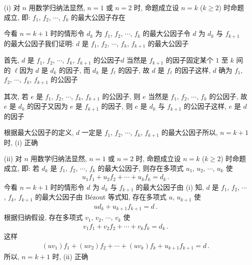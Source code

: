 \begin{pf}
    (i) 对 $n$ 用数学归纳法\period 显然, $n = 1$ 或 $n = 2$ 时, 命题成立\period 设 $n = k$ ($k \geq 2$) 时命题成立, 即: $f_1$, $f_2$, $\cdots$, $f_k$ 的最大公因子存在\period

    今看 $n = k+1$ 时的情形\period 令 $d_k$ 为 $f_1$, $f_2$, $\cdots$, $f_k$ 的最大公因子\period 令 $d$ 为 $d_k$ 与 $f_{k+1}$ 的最大公因子\period 我们证明: $d$ 是 $f_1$, $f_2$, $\cdots$, $f_k$, $f_{k+1}$ 的最大公因子\period

    首先, $d$ 是 $f_1$, $f_2$, $\cdots$, $f_k$, $f_{k+1}$ 的公因子\period $d$ 当然是 $f_{k+1}$ 的因子\period 固定某个 $1$ 至 $k$ 间的 $\ell$\period 因为 $d$ 是 $d_k$ 的因子, 而 $d_k$ 是 $f_{\ell}$ 的因子, 故 $d$ 是 $f_{\ell}$ 的因子\period 这样, $d$ 确为 $f_1$, $f_2$, $\cdots$, $f_k$, $f_{k+1}$ 的公因子\period

    其次, 若 $e$ 是 $f_1$, $f_2$, $\cdots$, $f_k$, $f_{k+1}$ 的公因子, 则 $e$ 当然是 $f_1$, $f_2$, $\cdots$, $f_{k}$ 的公因子, 故 $e$ 是 $d_k$ 的因子\period 又因为 $e$ 是 $f_{k+1}$ 的因子, 则 $e$ 是 $d_k$ 与 $f_{k+1}$ 的公因子\period 这样, $e$ 是 $d$ 的因子\period

    根据最大公因子的定义, $d$ 一定是 $f_1$, $f_2$, $\cdots$, $f_k$, $f_{k+1}$ 的最大公因子\period 所以, $n = k+1$ 时, (i) 正确\period

    (ii) 对 $n$ 用数学归纳法\period 显然, $n = 1$ 或 $n = 2$ 时, 命题成立\period 设 $n = k$ ($k \geq 2$) 时命题成立, 即: 若 $d_k$ 是 $f_1$, $f_2$, $\cdots$, $f_k$ 的最大公因子, 则存在多项式 $u_1$, $u_2$, $\cdots$, $u_k$ 使
    \begin{align*}
        u_1 f_1 + u_2 f_2 + \cdots + u_k f_k = d_k \period
    \end{align*}
    今看 $n = k+1$ 时的情形\period 令 $d$ 为 $d_k$ 与 $f_{k+1}$ 的最大公因子\period 由 (i) 知, $d$ 是 $f_1$, $f_2$, $\cdots$, $f_k$, $f_{k+1}$ 的最大公因子\period 由 Bézout 等式知, 存在多项式 $u$, $u_{k+1}$ 使
    \begin{align*}
        u d_k + u_{k+1} f_{k+1} = d \period
    \end{align*}
    根据归纳假设, 存在多项式 $v_1$, $v_2$, $\cdots$, $v_k$ 使
    \begin{align*}
        v_1 f_1 + v_2 f_2 + \cdots + v_k f_k = d_k \period
    \end{align*}
    这样
    \begin{align*}
        (uv_1) f_1 + (uv_2) f_2 + \cdots + (uv_k) f_k + u_{k+1} f_{k+1} = d \period
    \end{align*}
    所以, $n = k+1$ 时, (ii) 正确\period
\end{pf}

